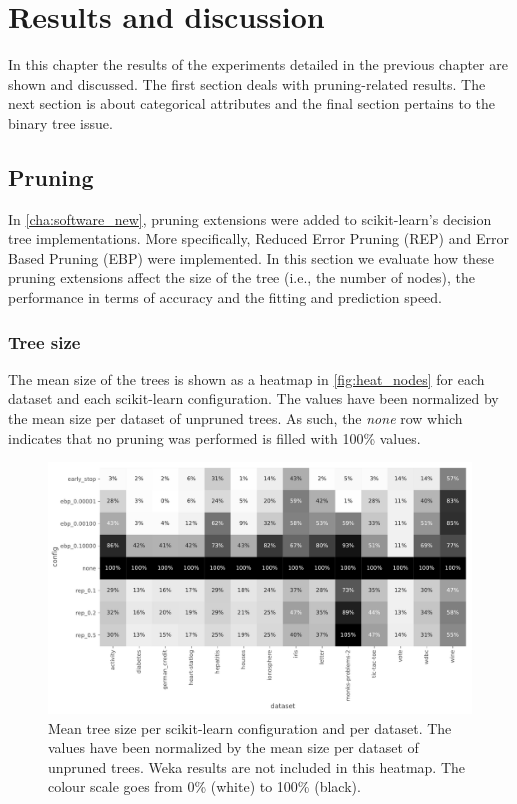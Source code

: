 \chapter{Results and discussion}\label{cha:results}
In this chapter the results of the experiments detailed in the previous chapter are shown and discussed. The first section deals with pruning-related results. The next section is about categorical attributes and the final section pertains to the binary tree issue.

\section{Pruning}
In \autoref{cha:software_new}, pruning extensions were added to scikit-learn's decision tree implementations. More specifically, Reduced Error Pruning (REP) and Error Based Pruning (EBP) were implemented. In this section we evaluate how these pruning extensions affect the size of the tree (i.e., the number of nodes), the performance in terms of accuracy and the fitting and prediction speed.

\subsection{Tree size}\label{ssec:pruning_treesize}
The mean size of the trees is shown as a heatmap in \autoref{fig:heat_nodes} for each dataset and each scikit-learn configuration. The values have been normalized by the mean size per dataset of unpruned trees. As such, the \emph{none} row which indicates that no pruning was performed is filled with 100\% values.

\begin{figure}[htp]
    \includegraphics[width=\textwidth]{img/heatmap_n_nodes.pdf}
    \caption{Mean tree size per scikit-learn configuration and per dataset. The values have been normalized by the mean size per dataset of unpruned trees. Weka results are not included in this heatmap. The colour scale goes from 0\% (white) to 100\% (black).}%
    \label{fig:heat_nodes}
\end{figure}

